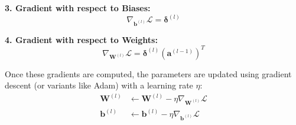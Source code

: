 \documentclass[11pt, a4paper]{article}
\begin{document}
\noindent\textbf{3. Gradient with respect to Biases:}
\begin{equation}
    \nabla_{\mathbf{b}^{(l)}} \mathcal{L} = \mathbf{\delta}^{(l)}
\end{equation}

\noindent\textbf{4. Gradient with respect to Weights:}
\begin{equation}
    \nabla_{\mathbf{W}^{(l)}} \mathcal{L} = \mathbf{\delta}^{(l)} (\mathbf{a}^{(l-1)})^T
\end{equation}
\vspace{0.5cm}

Once these gradients are computed, the parameters are updated using gradient descent (or variants like Adam) with a learning rate $\eta$:
\begin{align}
    \mathbf{W}^{(l)} &\leftarrow \mathbf{W}^{(l)} - \eta \nabla_{\mathbf{W}^{(l)}} \mathcal{L} \\
    \mathbf{b}^{(l)} &\leftarrow \mathbf{b}^{(l)} - \eta \nabla_{\mathbf{b}^{(l)}} \mathcal{L}
\end{align}
\end{document}
